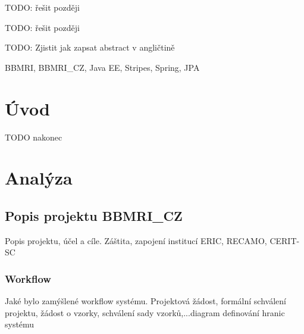 \documentclass[11pt,draft,oneside]{fithesis2}
\begin{document}
\FrontMatter
\ThesisTitlePage

\begin{ThesisDeclaration}
  \DeclarationText
  \AdvisorName
\end{ThesisDeclaration}

\begin{ThesisThanks}
TODO: řešit později
\end{ThesisThanks}

\begin{ThesisAbstract}
TODO: řešit později
\end{ThesisAbstract}


\begin{ThesisAbstracten}
TODO: Zjistit jak zapsat abstract v angličtině
\end{ThesisAbstracten}



\begin{ThesisKeyWords}
BBMRI, BBMRI\_CZ, Java EE, Stripes, Spring, JPA
\end{ThesisKeyWords}

\MainMatter

\tableofcontents

\chapter{Úvod}
TODO nakonec

\chapter{Analýza}

\section{Popis projektu BBMRI\_CZ}
Popis projektu, účel a cíle. Záštita, zapojení institucí ERIC, RECAMO, CERIT-SC

\subsection{Workflow}
Jaké bylo zamýšlené workflow systému. Projektová žádost, formální schválení projektu, žádost o vzorky, schválení sady vzorků,...diagram
definování hranic systému
\end{document}
